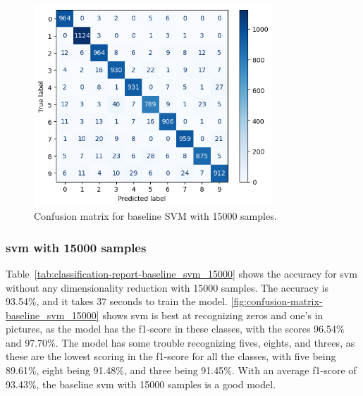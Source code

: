 
\begin{figure}[htb!]
    \centering
    \includegraphics[width=0.8\textwidth]{figures/1-experiment/confusion_matrix_baseline_svm_15000.png}
    \caption{Confusion matrix for baseline SVM with 15000 samples.}
    \label{fig:confusion-matrix-baseline_svm_15000}
\end{figure}
\subsubsection{\gls{svm} with 15000 samples}\label{subsubsec:experiment-1-results-svm-15000}
Table~\ref{tab:classification-report-baseline_svm_15000} shows the accuracy for \gls{svm} without any dimensionality reduction with 15000 samples. The accuracy is 93.54\%, and it takes 37 seconds to train the model. \autoref{fig:confusion-matrix-baseline_svm_15000} shows \gls{svm} is best at recognizing zeros and one's in pictures, as the model has the f1-score in these classes, with the scores 96.54\% and 97.70\%. The model has some trouble recognizing fives, eights, and threes, as these are the lowest scoring in the f1-score for all the classes, with five being 89.61\%, eight being 91.48\%, and three being 91.45\%. With an average f1-score of 93.43\%, the baseline \gls{svm} with 15000 samples is a good model.

